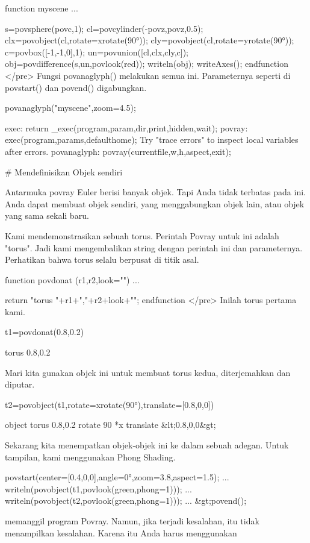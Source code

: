 \documentclass{article}
\begin{document}
\>function myscene ...


      s=povsphere(povc,1);
      cl=povcylinder(-povz,povz,0.5);
      clx=povobject(cl,rotate=xrotate(90°));
      cly=povobject(cl,rotate=yrotate(90°));
      c=povbox([-1,-1,0],1);
      un=povunion([cl,clx,cly,c]);
      obj=povdifference(s,un,povlook(red));
      writeln(obj);
      writeAxes();
    endfunction
</pre>
Fungsi povanaglyph() melakukan semua ini. Parameternya seperti di
povstart() dan povend() digabungkan.


\>povanaglyph("myscene",zoom=4.5);


    exec:
        return _exec(program,param,dir,print,hidden,wait);
    povray:
        exec(program,params,defaulthome);
    Try "trace errors" to inspect local variables after errors.
    povanaglyph:
        povray(currentfile,w,h,aspect,exit); 

# Mendefinisikan Objek sendiri

Antarmuka povray Euler berisi banyak objek. Tapi Anda tidak terbatas
pada ini. Anda dapat membuat objek sendiri, yang menggabungkan objek
lain, atau objek yang sama sekali baru.


Kami mendemonstrasikan sebuah torus. Perintah Povray untuk ini adalah
"torus". Jadi kami mengembalikan string dengan perintah ini dan
parameternya. Perhatikan bahwa torus selalu berpusat di titik asal.


\>function povdonat (r1,r2,look="") ...


      return "torus {"+r1+","+r2+look+"}";
    endfunction
</pre>
Inilah torus pertama kami.


\>t1=povdonat(0.8,0.2)


    torus {0.8,0.2}

Mari kita gunakan objek ini untuk membuat torus kedua, diterjemahkan
dan diputar.


\>t2=povobject(t1,rotate=xrotate(90°),translate=[0.8,0,0])


    object { torus {0.8,0.2}
     rotate 90 *x 
     translate &lt;0.8,0,0&gt;
     }

Sekarang kita menempatkan objek-objek ini ke dalam sebuah adegan.
Untuk tampilan, kami menggunakan Phong Shading.


\>povstart(center=[0.4,0,0],angle=0°,zoom=3.8,aspect=1.5); ...  
\>   writeln(povobject(t1,povlook(green,phong=1))); ...  
\>   writeln(povobject(t2,povlook(green,phong=1))); ...  
\>  
&gt;povend();


memanggil program Povray. Namun, jika terjadi kesalahan, itu tidak
menampilkan kesalahan. Karena itu Anda harus menggunakan
\end{document}
